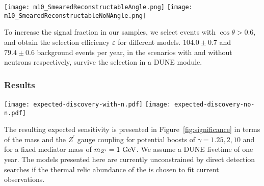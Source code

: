 \begin{figure*}[!htb]
\centering
\texttt{[image: m10\_SmearedReconstructableAngle.png]}
\texttt{[image: m10\_SmearedReconstructableNoNAngle.png]}
\caption[Angular distribution of the  signal events with the  mass of 10\,GeV]{Angular distribution of the  signal events with the  mass of 10\,GeV
and different boosted factors, $\gamma$, and of the atmospheric neutrino NC
background events.
$\theta$ represents the angle of the sum over all the stable final state
particles as detailed in the text.
The amount of background represents one-year data collection, magnified by a factor 100,
while the amount of signal reflects the detection efficiency of 10,000  events, as
described in this note.
The left plot shows the scenario where neutrons can be reconstructed,
while the right plot represents the scenario without neutrons.}
\label{fig:m10_SmearedReconstructableAngle}
\end{figure*}


To increase the signal fraction in our samples, we select events with $\cos\theta > 0.6$,
and obtain the selection efficiency $\varepsilon$ for different  models.
$104.0 \pm 0.7$ and $79.4 \pm 0.6$ background events per year, in the scenarios with and without neutrons respectively,
survive the selection in a DUNE \nominalmodsize module.

\subsubsection{Results}

\begin{figure*}[!htb]
\centering
\texttt{[image: expected-discovery-with-n.pdf]}\hspace{0.05\textwidth}
\texttt{[image: expected-discovery-no-n.pdf]}
\caption[Expected $5\sigma$ discovery reach with one year of DUNE livetime]{Expected $5\sigma$ discovery reach with one year of DUNE livetime including neutrons in reconstruction (left) and excluding neutrons (right).\label{fig:significance}}
\end{figure*}
The resulting expected sensitivity is presented in Figure~\ref{fig:significance} in terms of the  mass and the $Z^\prime$ gauge coupling for potential  boosts of $\gamma = 1.25,2,10$ and for a fixed mediator mass of $m_{Z^\prime} = 1~{\rm GeV}$.  We assume a DUNE livetime of one year.  The models presented here are currently unconstrained by direct detection searches if the thermal relic abundance of the  is chosen to fit current observations.

